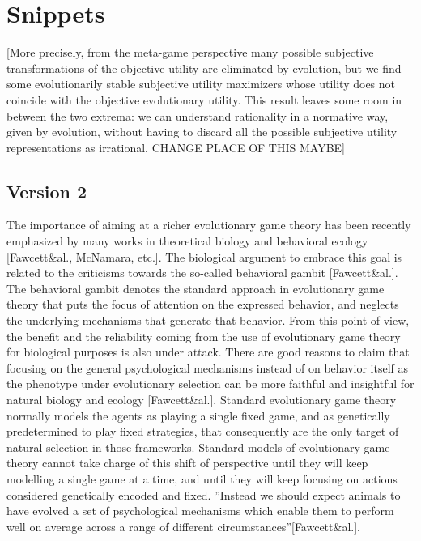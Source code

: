\documentclass[fleqn,reqno,11pt]{article}
\begin{document}
\newpage

\section{Snippets}

[More precisely, from the meta-game perspective many possible subjective
transformations of the objective utility are eliminated by evolution, but we find some
evolutionarily stable subjective utility maximizers whose utility does not coincide with the
objective evolutionary utility. This result leaves some room in between the two extrema: we can
understand rationality in a normative way, given by evolution, without having to discard all
the possible subjective utility representations as irrational. CHANGE PLACE OF THIS MAYBE]



\subsection{Version 2}

The importance of aiming at a richer evolutionary game theory has been recently emphasized by many works in theoretical biology and behavioral ecology [Fawcett\&al., McNamara, etc.]. The biological argument to embrace this goal is related to the criticisms towards the so-called behavioral gambit [Fawcett\&al.]. The behavioral gambit denotes the standard approach in evolutionary game theory that puts the focus of attention on the expressed behavior, and neglects the underlying mechanisms that generate that behavior. From this point of view, the benefit and the reliability coming from the use of evolutionary game theory for biological purposes is also under attack. There are good reasons to claim that focusing on the general psychological mechanisms instead of on behavior itself as the phenotype under evolutionary selection can be more faithful and insightful for natural biology and ecology [Fawcett\&al.].
Standard evolutionary game theory normally models the agents as playing a single fixed game, and as genetically predetermined to play fixed strategies, that consequently are the only target of natural selection in those frameworks. Standard models of evolutionary game theory cannot take charge of this shift of perspective until they will keep modelling a single game at a time, and until they will keep focusing on actions considered genetically encoded and fixed. ''Instead we should expect animals to have evolved a set of psychological mechanisms which enable them to perform well on average across a range of different circumstances''[Fawcett\&al.].
\end{document}
